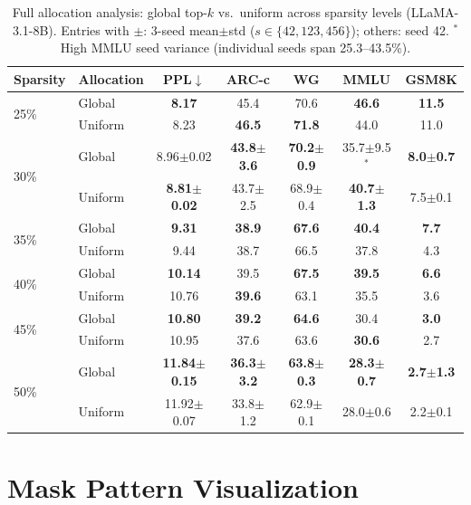 \begin{table}[t]
\centering
\caption{Full allocation analysis: global top-$k$ vs.\ uniform across sparsity levels (LLaMA-3.1-8B). Entries with $\pm$: 3-seed mean$\pm$std ($s \in \{42, 123, 456\}$); others: seed 42. $^\ast$High MMLU seed variance (individual seeds span 25.3--43.5\%).}
\label{tab:phase_full}
\begin{tabular}{llccccc}
\toprule
Sparsity & Allocation & PPL$\downarrow$ & ARC-c & WG & MMLU & GSM8K \\
\midrule
\multirow{2}{*}{25\%}
& Global & \textbf{8.17} & 45.4 & 70.6 & \textbf{46.6} & \textbf{11.5} \\
& Uniform & 8.23 & \textbf{46.5} & \textbf{71.8} & 44.0 & 11.0 \\
\midrule
\multirow{2}{*}{30\%}
& Global & 8.96$\pm$0.02 & \textbf{43.8$\pm$3.6} & \textbf{70.2$\pm$0.9} & 35.7$\pm$9.5$^\ast$ & \textbf{8.0$\pm$0.7} \\
& Uniform & \textbf{8.81$\pm$0.02} & 43.7$\pm$2.5 & 68.9$\pm$0.4 & \textbf{40.7$\pm$1.3} & 7.5$\pm$0.1 \\
\midrule
\multirow{2}{*}{35\%}
& Global & \textbf{9.31} & \textbf{38.9} & \textbf{67.6} & \textbf{40.4} & \textbf{7.7} \\
& Uniform & 9.44 & 38.7 & 66.5 & 37.8 & 4.3 \\
\midrule
\multirow{2}{*}{40\%}
& Global & \textbf{10.14} & 39.5 & \textbf{67.5} & \textbf{39.5} & \textbf{6.6} \\
& Uniform & 10.76 & \textbf{39.6} & 63.1 & 35.5 & 3.6 \\
\midrule
\multirow{2}{*}{45\%}
& Global & \textbf{10.80} & \textbf{39.2} & \textbf{64.6} & 30.4 & \textbf{3.0} \\
& Uniform & 10.95 & 37.6 & 63.6 & \textbf{30.6} & 2.7 \\
\midrule
\multirow{2}{*}{50\%}
& Global & \textbf{11.84$\pm$0.15} & \textbf{36.3$\pm$3.2} & \textbf{63.8$\pm$0.3} & \textbf{28.3$\pm$0.7} & \textbf{2.7$\pm$1.3} \\
& Uniform & 11.92$\pm$0.07 & 33.8$\pm$1.2 & 62.9$\pm$0.1 & 28.0$\pm$0.6 & 2.2$\pm$0.1 \\
\bottomrule
\end{tabular}
\end{table}


\section{Mask Pattern Visualization}
\label{app:mask_viz}

